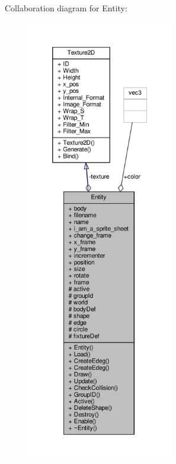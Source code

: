 Collaboration diagram for Entity\+:
\nopagebreak
\begin{figure}[H]
\begin{center}
\leavevmode
\includegraphics[height=550pt]{classEntity__coll__graph}
\end{center}
\end{figure}
